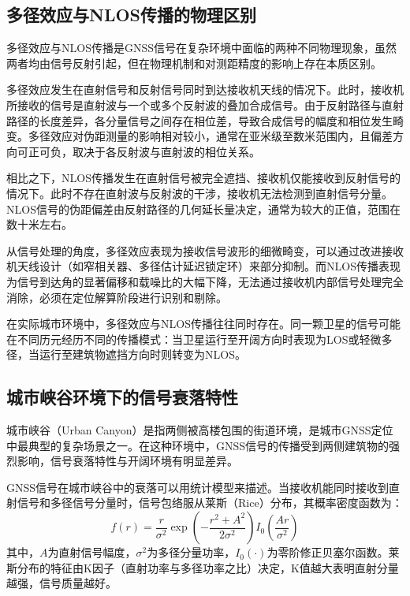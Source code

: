\subsection{多径效应与NLOS传播的物理区别}

    多径效应与NLOS传播是GNSS信号在复杂环境中面临的两种不同物理现象，虽然两者均由信号反射引起，但在物理机制和对测距精度的影响上存在本质区别。

    多径效应发生在直射信号和反射信号同时到达接收机天线的情况下。此时，接收机所接收的信号是直射波与一个或多个反射波的叠加合成信号。由于反射路径与直射路径的长度差异，各分量信号之间存在相位差，导致合成信号的幅度和相位发生畸变。多径效应对伪距测量的影响相对较小，通常在亚米级至数米范围内，且偏差方向可正可负，取决于各反射波与直射波的相位关系。

    相比之下，NLOS传播发生在直射信号被完全遮挡、接收机仅能接收到反射信号的情况下。此时不存在直射波与反射波的干涉，接收机无法检测到直射信号分量。NLOS信号的伪距偏差由反射路径的几何延长量决定，通常为较大的正值，范围在数十米左右。

    从信号处理的角度，多径效应表现为接收信号波形的细微畸变，可以通过改进接收机天线设计（如窄相关器、多径估计延迟锁定环）来部分抑制。而NLOS传播表现为信号到达角的显著偏移和载噪比的大幅下降，无法通过接收机内部信号处理完全消除，必须在定位解算阶段进行识别和剔除。

    在实际城市环境中，多径效应与NLOS传播往往同时存在\cite{mohanty2024survey, zheng2025stacking}。同一颗卫星的信号可能在不同历元经历不同的传播模式：当卫星运行至开阔方向时表现为LOS或轻微多径，当运行至建筑物遮挡方向时则转变为NLOS。

\subsection{城市峡谷环境下的信号衰落特性}

    城市峡谷（Urban Canyon）是指两侧被高楼包围的街道环境，是城市GNSS定位中最典型的复杂场景之一。在这种环境中，GNSS信号的传播受到两侧建筑物的强烈影响，信号衰落特性与开阔环境有明显差异。

    GNSS信号在城市峡谷中的衰落可以用统计模型来描述。当接收机能同时接收到直射信号和多径信号分量时，信号包络服从莱斯（Rice）分布，其概率密度函数为：
    \begin{equation}
    f(r) = \frac{r}{\sigma^2} \exp\left(-\frac{r^2 + A^2}{2\sigma^2}\right) I_0\left(\frac{Ar}{\sigma^2}\right)
    \end{equation}
    其中，$A$为直射信号幅度，$\sigma^2$为多径分量功率，$I_0(\cdot)$为零阶修正贝塞尔函数。莱斯分布的特征由K因子（直射功率与多径功率之比）决定，K值越大表明直射分量越强，信号质量越好。

